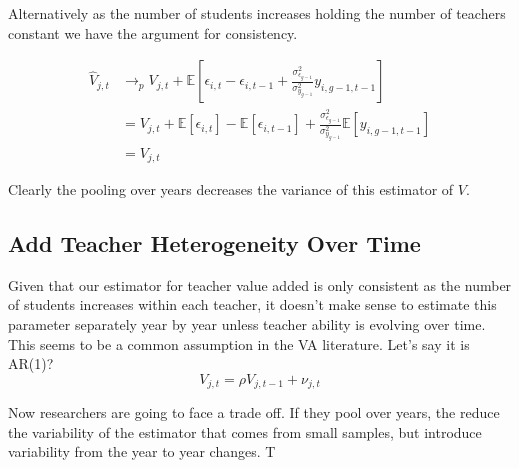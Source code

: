 \documentclass{article}
\theoremstyle{definition}
\theoremstyle{definition}
\begin{document}
Alternatively as the number of students increases holding the number of teachers constant we have the argument for consistency.

\begin{align*}
\hat{V}_{j,t} & \to_p V_{j,t} + \mathbb{E}  \left [ \epsilon_{i,t} - \epsilon_{i,t-1} + \frac{\sigma^2_{\epsilon_{g-1}}}{\sigma^2_{y_{g-1}}}   y_{i,g-1,t-1} \right ] \\
             & =  V_{j,t} + \mathbb{E}   [ \epsilon_{i,t}] - \mathbb{E}   [ \epsilon_{i,t-1}] + \frac{\sigma^2_{\epsilon_{g-1}}}{\sigma^2_{y_{g-1}}} \mathbb{E}   [   y_{i,g-1,t-1} ] \\
             & =  V_{j,t}
\end{align*}

Clearly the pooling over years decreases the variance of this estimator of $V$.

\subsection{Add Teacher Heterogeneity Over Time}
Given that our estimator for teacher value added is only consistent as the number of students increases within each teacher, it doesn't make sense to estimate this parameter separately year by year unless teacher ability is evolving over time. This seems to be a common assumption in the VA literature. Let's say it is AR(1)?
\[
V_{j,t}  = \rho V_{j,t-1} + \nu_{j,t}
\]

Now researchers are going to face a trade off. If they pool over years, the reduce the variability of the estimator that comes from small samples, but introduce variability from the year to year changes. T
\end{document}
